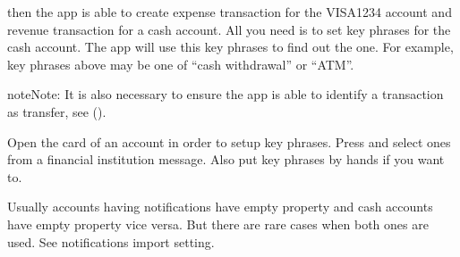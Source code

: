 \documentclass[a4paper,10pt,english]{sphinxmanual}
\begin{document}
\begin{sphinxVerbatim}[commandchars=\\\{\}]
           
\end{sphinxVerbatim}

then the app is able to create expense transaction for the VISA1234 account and revenue transaction
for a cash account. All you need is to set key phrases for the cash account. The app will
use this key phrases to find out the one. For example, key phrases above may be one of “cash withdrawal” or
“ATM”.

\begin{sphinxadmonition}{note}{Note:}
It is also necessary to ensure the app is able to identify a transaction as transfer, see {\hyperref[\detokenize{notifications:chapter-notifications}]{}} ().
\end{sphinxadmonition}

Open the card of an account in order to setup key phrases. Press  and
select ones from a financial institution message. Also put key phrases by hands
if you want to.

\noindent{}

\noindent{}

\noindent{}

Usually accounts having notifications have empty  property and cash accounts
have empty  property vice versa. But there are rare cases when both ones are used. See 
notifications import setting.
\end{document}
